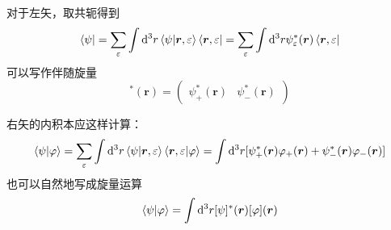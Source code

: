 \documentclass[cn,10pt,math=newtx,citestyle=gb7714-2015,bibstyle=gb7714-2015]{elegantbook}
\def\bm{\boldsymbol}
\def\d{\mathrm d}
\def\vphi{\varphi}
\def\ve{\varepsilon}
\begin{document}
对于左矢，取共轭得到
\begin{equation}
    \bra{\psi} = \sum_\ve\int\d^3 r\braket{\psi|\bm r,\ve}\bra{\bm r,\ve}=\sum_\ve\int\d^3 r\psi_\ve^*(\bm r)\bra{\bm r,\ve}
\end{equation}
可以写作伴随旋量
\begin{equation}
    [\psi]^*(\bm r) = \begin{pmatrix}
    \psi_+^*(\bm r) & \psi_-^*(\bm r)
    \end{pmatrix}
\end{equation}

右矢的内积本应这样计算：
\begin{equation}
    \braket{\psi|\vphi} = \sum_\ve\int\d^3 r\braket{\psi|\bm r,\ve}\braket{\bm r,\ve|\vphi} = \int\d^3 r[\psi_+^*(\bm r)\vphi_+(\bm r)+\psi_-^*(\bm r)\vphi_-(\bm r)]
\end{equation}
也可以自然地写成旋量运算
\begin{equation}
    \braket{\psi|\vphi} = \int\d^3 r[\psi]^*(\bm r)[\vphi](\bm r)
\end{equation}
\end{document}
